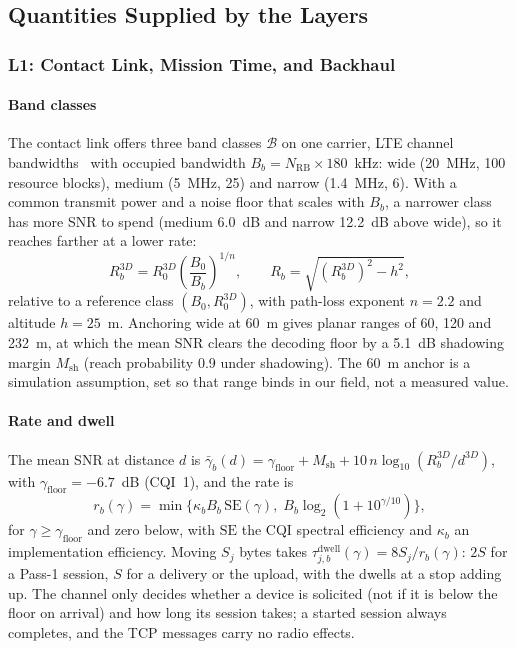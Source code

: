 \documentclass[conference]{IEEEtran}
\begin{document}
\subsection{Quantities Supplied by the Layers}
\label{sec:method:models}

\subsubsection{L1: Contact Link, Mission Time, and Backhaul}
\label{sec:method:l1}

\paragraph{Band classes}
The contact link offers three band classes $\mathcal{B}$ on one carrier, LTE
channel bandwidths~\cite{3gpp36104} with occupied bandwidth
$B_b=N_{\mathrm{RB}}\times180$~kHz: \textsf{wide} (20~MHz, 100 resource blocks),
\textsf{medium} (5~MHz, 25) and \textsf{narrow} (1.4~MHz, 6). With a common
transmit power and a noise floor that scales with $B_b$, a narrower class has
more SNR to spend (\textsf{medium} 6.0~dB and \textsf{narrow} 12.2~dB above
\textsf{wide}), so it reaches farther at a lower rate:
\begin{equation}
R_b^{3D} = R_0^{3D}\left(\frac{B_0}{B_b}\right)^{1/n},
\qquad
R_b = \sqrt{\left(R_b^{3D}\right)^2 - h^2},
\label{eq:range}
\end{equation}
relative to a reference class $(B_0,R_0^{3D})$, with path-loss exponent $n=2.2$
and altitude $h=25$~m. Anchoring \textsf{wide} at 60~m gives planar ranges of
60, 120 and 232~m, at which the mean SNR clears the decoding floor by a 5.1~dB
shadowing margin $M_{\mathrm{sh}}$ (reach probability 0.9 under shadowing). The
60~m anchor is a simulation assumption, set so that range binds in our field, not
a measured value.

\paragraph{Rate and dwell}
The mean SNR at distance $d$ is
$\bar\gamma_b(d)=\gamma_{\mathrm{floor}}+M_{\mathrm{sh}}+10\,n\log_{10}(R_b^{3D}/d^{3D})$,
with $\gamma_{\mathrm{floor}}=-6.7$~dB (CQI~1), and the rate is
\begin{equation}
r_b(\gamma)=\min\bigl\{\kappa_b B_b\,\mathrm{SE}(\gamma),\;B_b\log_2(1+10^{\gamma/10})\bigr\},
\label{eq:rate}
\end{equation}
for $\gamma\ge\gamma_{\mathrm{floor}}$ and zero below, with $\mathrm{SE}$ the CQI
spectral efficiency and $\kappa_b$ an implementation efficiency. Moving $S_j$
bytes takes $\tau_{j,b}^{\mathrm{dwell}}(\gamma)=8S_j/r_b(\gamma)$: $2S$ for a
Pass-1 session, $S$ for a delivery or the upload, with the dwells at a stop
adding up. The channel only decides whether a device is solicited (not if it is
below the floor on arrival) and how long its session takes; a started session
always completes, and the TCP messages carry no radio effects.
\end{document}
